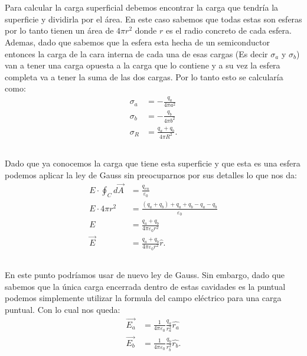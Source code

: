 \documentclass{report}
\begin{document}
\chapter{}

\section{}

Para calcular la carga superficial debemos encontrar la carga que tendría la superficie y dividirla por el área. En este caso sabemos que todas estas son esferas por lo tanto tienen un área de $4\pi r^2$ donde $r$ es el radio concreto de cada esfera. Ademas, dado que sabemos que la esfera esta hecha de un semiconductor entonces la carga de la cara interna de cada una de esas cargas (Es decir $\sigma_a$ y $\sigma_b$) van a tener una carga opuesta a la carga que lo contiene y a su vez la esfera completa va a tener la suma de las dos cargas. Por lo tanto esto se calcularía como:
\begin{align*}
  \sigma_a &= - \frac{q_a}{4\pi a^2} \\
  \sigma_b &= - \frac{q_b}{4\pi b^2} \\
  \sigma_R &= \frac{q_a + q_b}{4\pi R^2}
.\end{align*}

\section{}

Dado que ya conocemos la carga que tiene esta superficie y que esta es una esfera podemos aplicar la ley de Gauss sin preocuparnos por sus detalles lo que nos da:
\begin{align*}
  E \cdot \oint_{C} d\vec{A} &= \frac{q_{en}}{\varepsilon_0} \\ 
  E \cdot 4 \pi r^2 &= \frac{\left( q_a + q_b \right) + q_a + q_b - q_a - q_b}{\varepsilon_0} \\
  E &= \frac{q_a + q_b}{4\pi \varepsilon_0 r^2} \\
  \vec{E} &= \frac{q_a + q_b}{4\pi \varepsilon_0 r^2} \hat{r}
.\end{align*}

\section{}

En este punto podríamos usar de nuevo ley de Gauss. Sin embargo, dado que sabemos que la única carga encerrada dentro de estas cavidades es la puntual podemos simplemente utilizar la formula del campo eléctrico para una carga puntual. Con lo cual nos queda:
\begin{align*}
  \vec{E_a} &= \frac{1}{4\pi\varepsilon_0}\frac{q_a}{r_a^2}\hat{r_a} \\
  \vec{E_b} &= \frac{1}{4\pi\varepsilon_0}\frac{q_b}{r_b^2}\hat{r_b}
.\end{align*}
\end{document}
